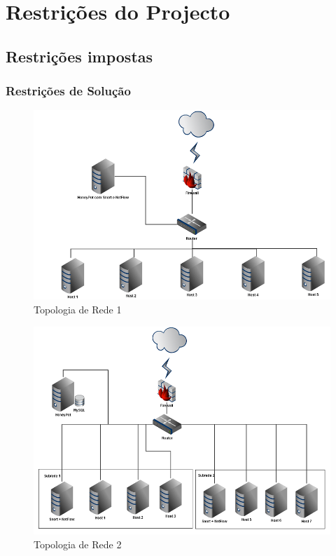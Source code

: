 \chapter{Restrições do Projecto}
\section{Restrições impostas}
\subsection{Restrições de Solução}

\begin{figure}
	\centering	
	\includegraphics[scale=0.7]{images/topologia1.png}
	\caption{Topologia de Rede 1}
\end{figure}

\begin{figure}
	\centering	
	\includegraphics[scale=0.7]{images/topologia3.png}
	\caption{Topologia de Rede 2}
\end{figure}


